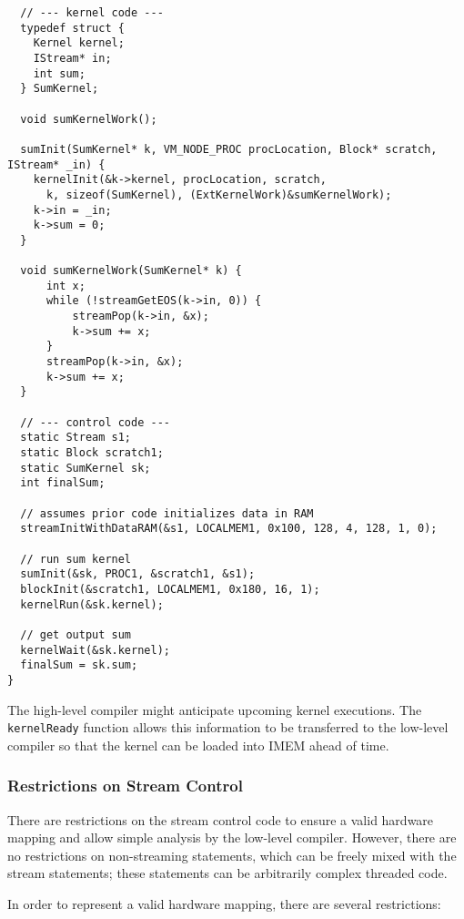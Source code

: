 {\small
\begin{verbatim}
  // --- kernel code ---
  typedef struct {
    Kernel kernel;
    IStream* in;
    int sum;
  } SumKernel;

  void sumKernelWork();
  
  sumInit(SumKernel* k, VM_NODE_PROC procLocation, Block* scratch, IStream* _in) {
    kernelInit(&k->kernel, procLocation, scratch,
      k, sizeof(SumKernel), (ExtKernelWork)&sumKernelWork); 
    k->in = _in;
    k->sum = 0;
  }

  void sumKernelWork(SumKernel* k) {
      int x;
      while (!streamGetEOS(k->in, 0)) {
          streamPop(k->in, &x);
          k->sum += x;
      }
      streamPop(k->in, &x);
      k->sum += x;
  }

  // --- control code ---
  static Stream s1;
  static Block scratch1;
  static SumKernel sk;
  int finalSum;

  // assumes prior code initializes data in RAM
  streamInitWithDataRAM(&s1, LOCALMEM1, 0x100, 128, 4, 128, 1, 0);

  // run sum kernel
  sumInit(&sk, PROC1, &scratch1, &s1);
  blockInit(&scratch1, LOCALMEM1, 0x180, 16, 1);
  kernelRun(&sk.kernel);

  // get output sum
  kernelWait(&sk.kernel);
  finalSum = sk.sum; 
}\end{verbatim}}


The high-level compiler might anticipate upcoming kernel
executions. The {\tt kernelReady} function allows this information to
be transferred to the low-level compiler so that the kernel can be
loaded into IMEM ahead of time.

\subsubsection{Restrictions on Stream Control}

There are restrictions on the stream control code to ensure a valid
hardware mapping and allow simple analysis by the low-level
compiler. However, there are no restrictions on non-streaming
statements, which can be freely mixed with the stream statements;
these statements can be arbitrarily complex threaded code.

In order to represent a valid hardware mapping, there are several restrictions:

\renewcommand{\labelenumi}{A\theenumi.}

